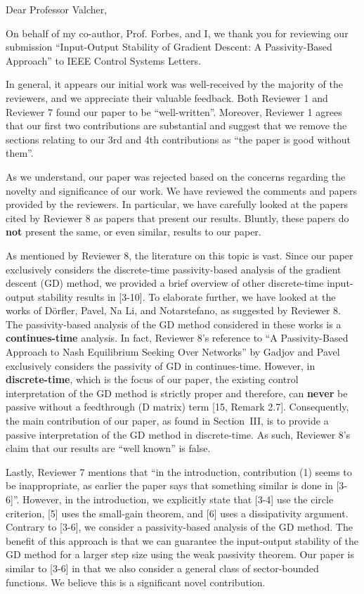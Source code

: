 \thispagestyle{empty}
\setcounter{page}{0}
\begin{flushleft}
    Dear Professor Valcher,

    On behalf of my co-author, Prof. Forbes, and I, we thank you for reviewing our submission ``Input-Output Stability of Gradient Descent: A Passivity-Based Approach'' to IEEE Control Systems Letters.

    In general, it appears our initial work was well-received by the majority of the reviewers, and we appreciate their valuable feedback. Both Reviewer 1 and Reviewer 7 found our paper to be ``well-written''. Moreover, Reviewer 1 agrees that our first two contributions are substantial and suggest that we remove the sections relating to our 3rd and 4th contributions as ``the paper is good without them''.
    
    As we understand, our paper was rejected based on the concerns regarding the novelty and significance of our work. We have reviewed the comments and papers provided by the reviewers. In particular, we have carefully looked at the papers cited by Reviewer 8 as papers that present our results. Bluntly, these papers do \textbf{not} present the same, or even similar, results to our paper.

    As mentioned by Reviewer 8, the literature on this topic is vast. Since our paper exclusively considers the discrete-time passivity-based analysis of the gradient descent (GD) method, we provided a brief overview of other discrete-time input-output stability results in [3-10]. To elaborate further, we have looked at the works of Dörfler, Pavel, Na Li, and Notarstefano, as suggested by Reviewer 8. The passivity-based analysis of the GD method considered in these works is a \textbf{continues-time} analysis. In fact, Reviewer 8's reference to ``A Passivity-Based Approach to Nash Equilibrium Seeking Over Networks'' by Gadjov and Pavel exclusively considers the passivity of GD in continues-time. However, in \textbf{discrete-time}, which is the focus of our paper, the existing control interpretation of the GD method is strictly proper and therefore, can \textbf{never} be passive without a feedthrough (D matrix) term [15, Remark 2.7]. Consequently, the main contribution of our paper, as found in Section~III, is to provide a passive interpretation of the GD method in discrete-time. As such, Reviewer 8's claim that our results are ``well known'' is false.

    Lastly, Reviewer 7 mentions that ``in the introduction, contribution (1) seems to be inappropriate, as earlier the paper says that something similar is done in [3-6]''. However, in the introduction, we explicitly state that [3-4] use the circle criterion, [5] uses the small-gain theorem, and [6] uses a dissipativity argument. Contrary to [3-6], we consider a passivity-based analysis of the GD method. The benefit of this approach is that we can guarantee the input-output stability of the GD method for a larger step size using the weak passivity theorem. Our paper is similar to [3-6] in that we also consider a general class of sector-bounded functions. We believe this is a significant novel contribution.


\end{flushleft}
